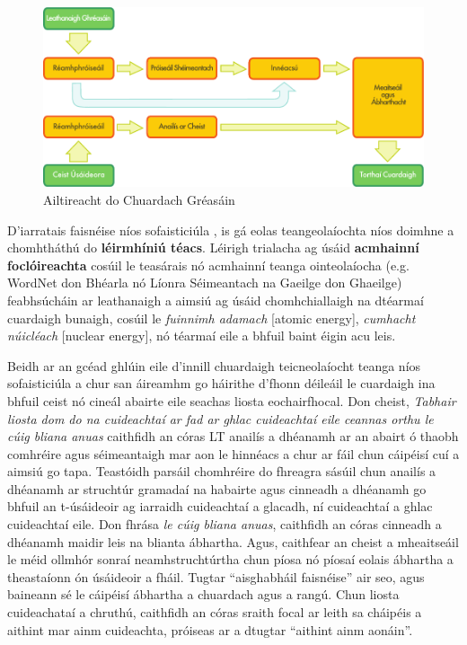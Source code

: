 \documentclass[]{../../metanetpaper}
\begin{document}
\begin{multicols}{2}
\begin{figure}[htb]
  \center
  \includegraphics[width=\textwidth]{../_media/irish/web_search_architecture}
  \caption{Ailtireacht do Chuardach Gréasáin}
  \label{fig:websearcharch_de}
\end{figure}

D’iarratais faisnéise níos sofaisticiúla , is gá eolas teangeolaíochta níos doimhne a chomhtháthú do \textbf{léirmhíniú téacs}. Léirigh trialacha ag úsáid \textbf{acmhainní foclóireachta} cosúil le teasárais nó acmhainní teanga ointeolaíocha (e.g. WordNet don Bhéarla nó Líonra Séimeantach na Gaeilge don Ghaeilge) feabhsúcháin ar leathanaigh a aimsiú ag úsáid chomhchiallaigh na dtéarmaí cuardaigh bunaigh, cosúil le \textit{fuinnimh adamach} [atomic energy], \textit{cumhacht núicléach} [nuclear energy], nó téarmaí eile a bhfuil baint éigin acu leis.

Beidh ar an gcéad ghlúin eile d’innill chuardaigh teicneolaíocht teanga níos sofaisticiúla a chur san áireamhm go háirithe d’fhonn déileáil le cuardaigh ina bhfuil ceist nó cineál abairte eile seachas liosta eochairfhocal. Don cheist, \textit{Tabhair liosta dom do na cuideachtaí ar fad ar ghlac cuideachtaí eile ceannas orthu le cúig bliana anuas} caithfidh an córas LT anailís a dhéanamh ar an abairt ó thaobh comhréire agus séimeantaigh mar aon le hinnéacs a chur ar fáil chun cáipéisí cuí a aimsiú go tapa. Teastóidh parsáil chomhréire do fhreagra sásúil chun anailís a dhéanamh ar struchtúr gramadaí na habairte agus cinneadh a dhéanamh go bhfuil an t-úsáideoir ag iarraidh cuideachtaí a glacadh, ní cuideachtaí a ghlac cuideachtaí eile. Don fhrása \textit{le cúig bliana anuas}, caithfidh an córas cinneadh a dhéanamh maidir leis na blianta ábhartha. Agus, caithfear an cheist a mheaitseáil le méid ollmhór sonraí neamhstruchtúrtha chun píosa nó píosaí eolais ábhartha a theastaíonn ón úsáideoir a fháil. Tugtar ``aisghabháil faisnéise'' air seo, agus baineann sé le cáipéisí ábhartha a chuardach agus a rangú. Chun liosta cuideachataí a chruthú, caithfidh an córas sraith focal ar leith sa cháipéis a aithint mar ainm cuideachta, próiseas ar a dtugtar ``aithint ainm aonáin''.


\end{multicols}
\end{document}
